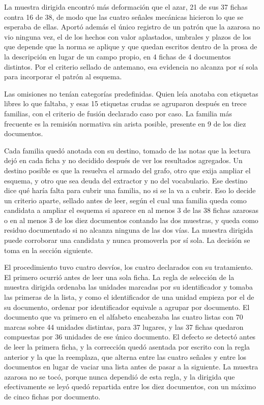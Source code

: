 \documentclass[12pt,a4paper]{report}
\begin{document}
La muestra dirigida encontró más deformación que el azar, 21 de sus 37 fichas contra 16 de 38, de modo que las cuatro señales mecánicas hicieron lo que se esperaba de ellas. Aportó además el único registro de un patrón que la azarosa no vio ninguna vez, el de los hechos con valor aplastados, umbrales y plazos de los que depende que la norma se aplique y que quedan escritos dentro de la prosa de la descripción en lugar de un campo propio, en 4 fichas de 4 documentos distintos. Por el criterio sellado de antemano, esa evidencia no alcanza por sí sola para incorporar el patrón al esquema.

Las omisiones no tenían categorías predefinidas. Quien leía anotaba con etiquetas libres lo que faltaba, y esas 15 etiquetas crudas se agruparon después en trece familias, con el criterio de fusión declarado caso por caso. La familia más frecuente es la remisión normativa sin arista posible, presente en 9 de los diez documentos.

Cada familia quedó anotada con su destino, tomado de las notas que la lectura dejó en cada ficha y no decidido después de ver los resultados agregados. Un destino posible es que la resuelva el armado del grafo, otro que exija ampliar el esquema, y otro que sea deuda del extractor y no del vocabulario. Ese destino dice qué haría falta para cubrir una familia, no si se la va a cubrir. Eso lo decide un criterio aparte, sellado antes de leer, según el cual una familia queda como candidata a ampliar el esquema si aparece en al menos 3 de las 38 fichas azarosas o en al menos 3 de los diez documentos contando las dos muestras, y queda como residuo documentado si no alcanza ninguna de las dos vías. La muestra dirigida puede corroborar una candidata y nunca promoverla por sí sola. La decisión se toma en la sección siguiente.

El procedimiento tuvo cuatro desvíos, los cuatro declarados con su tratamiento. El primero ocurrió antes de leer una sola ficha. La regla de selección de la muestra dirigida ordenaba las unidades marcadas por su identificador y tomaba las primeras de la lista, y como el identificador de una unidad empieza por el de su documento, ordenar por identificador equivale a agrupar por documento. El documento que va primero en el alfabeto encabezaba las cuatro listas con 70 marcas sobre 44 unidades distintas, para 37 lugares, y las 37 fichas quedaron compuestas por 36 unidades de ese único documento. El defecto se detectó antes de leer la primera ficha, y la corrección quedó asentada por escrito con la regla anterior y la que la reemplaza, que alterna entre las cuatro señales y entre los documentos en lugar de vaciar una lista antes de pasar a la siguiente. La muestra azarosa no se tocó, porque nunca dependió de esta regla, y la dirigida que efectivamente se leyó quedó repartida entre los diez documentos, con un máximo de cinco fichas por documento.
\end{document}
